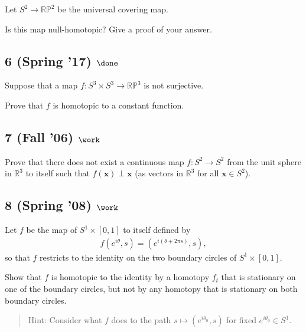 Let \(S^2 \to {\mathbb{RP}}^2\) be the universal covering map.

Is this map null-homotopic? Give a proof of your answer.

\hypertarget{spring-17-done-1}{%
\subsection{\texorpdfstring{6 (Spring '17)
\(\done\)}{6 (Spring '17) \textbackslash done}}\label{spring-17-done-1}}

Suppose that a map \(f : S^3 \times S^3 \to {\mathbb{RP}}^3\) is not
surjective.

Prove that \(f\) is homotopic to a constant function.


\hypertarget{fall-06-work-2}{%
\subsection{\texorpdfstring{7 (Fall '06)
\(\work\)}{7 (Fall '06) \textbackslash work}}\label{fall-06-work-2}}

Prove that there does not exist a continuous map \(f : S^2 \to S^2\)
from the unit sphere in \({\mathbb{R}}^3\) to itself such that
\(f (\mathbf{x}) \perp \mathbf{x}\) (as vectors in \({\mathbb{R}}^3\)
for all \(\mathbf{x} \in S^2\)).

\hypertarget{spring-08-work-4}{%
\subsection{\texorpdfstring{8 (Spring '08)
\(\work\)}{8 (Spring '08) \textbackslash work}}\label{spring-08-work-4}}

Let \(f\) be the map of \(S^1 \times [0, 1]\) to itself defined by
\begin{align*}
f (e^{i\theta} , s) = (e^{i(\theta+2\pi s)} , s)
,\end{align*}
so that \(f\) restricts to the identity on the two boundary circles of
\(S^1 \times [0, 1]\).

Show that \(f\) is homotopic to the identity by a homotopy \(f_t\) that
is stationary on one of the boundary circles, but not by any homotopy
that is stationary on both boundary circles.

\begin{quote}
Hint: Consider what \(f\) does to the path
\(s \mapsto (e^{i\theta_0} , s)\) for fixed \(e^{i\theta_0} \in S^1\).
\end{quote}


